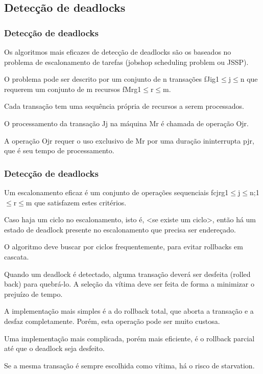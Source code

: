 \documentclass{beamer}
\begin{document}

\subsection{Detecção de deadlocks}
\begin{frame}
    \frametitle{Detecção de deadlocks}

    Os algoritmos mais eficazes de detecção de deadlocks são os baseados no problema de escalonamento de tarefas (jobshop scheduling problem ou JSSP).

    O problema pode ser descrito por um conjunto de n transações fJig1$\leq$j$\leq$n que requerem um conjunto de m recursos fMrg1$\leq$r$\leq$m.

    Cada transação tem uma sequência própria de recursos a serem processados.

    O processamento da transação Jj na máquina Mr é chamada de operação Ojr.

    A operação Ojr requer o uso exclusivo de Mr por uma duração ininterrupta pjr, que é seu tempo de processamento.

\end{frame}


\begin{frame}
    \frametitle{Detecção de deadlocks}

    Um escalonamento eficaz é um conjunto de operações sequenciais fcjrg1$\leq$j$\leq$n;1$\leq$r$\leq$m que satisfazem estes critérios.

    Caso haja um ciclo no escalonamento, isto é, <se existe um ciclo>, então há um estado de deadlock presente no escalonamento que precisa ser endereçado.

    O algoritmo deve buscar por ciclos frequentemente, para evitar rollbacks em cascata.

\end{frame}



\begin{frame}

    Quando um deadlock é detectado, alguma transação deverá ser desfeita (rolled back) para quebrá-lo. A seleção da vítima deve ser feita de forma a minimizar o prejuízo de tempo.

    A implementação mais simples é a do rollback total, que aborta a transação e a desfaz completamente. Porém, esta operação pode ser muito custosa.

    Uma implementação mais complicada, porém mais eficiente, é o rollback parcial até que o deadlock seja desfeito.

    Se a mesma transação é sempre escolhida como vítima, há o risco de starvation.

\end{frame}
\end{document}
